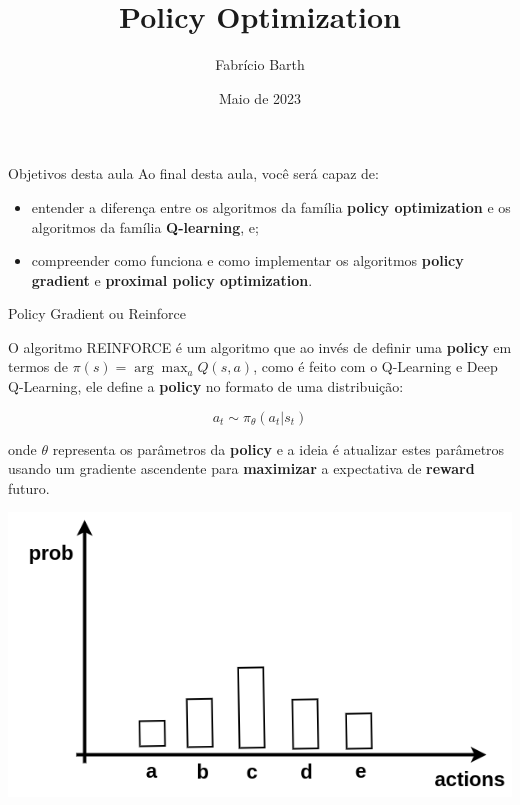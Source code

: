 \documentclass{beamer}
\begin{document}
	
\title{Policy Optimization} 
\author{Fabrício Barth}
\date{Maio de 2023}
	
\maketitle

\def\HiLi{\leavevmode\rlap{\hbox to \hsize{\color{yellow!50}\leaders\hrule height .8\baselineskip depth .5ex\hfill}}}
	
\begin{frame}{Objetivos desta aula}
	Ao final desta aula, você será capaz de: 
		
	\begin{itemize}
		\item entender a diferença entre os algoritmos da família \textbf{policy optimization} e os algoritmos da família \textbf{Q-learning}, e; 
		\item compreender como funciona e como implementar os algoritmos \textbf{policy gradient} e \textbf{proximal policy optimization}. 
	\end{itemize}
\end{frame}

\begin{frame}{Policy Gradient ou Reinforce}
	
	O algoritmo REINFORCE é um algoritmo que ao invés de definir uma \textbf{policy} em termos de $\pi(s) = \arg \max_{a} Q(s,a)$, como é feito com o Q-Learning e Deep Q-Learning, ele define a \textbf{policy} no formato de uma distribuição: 
	
	\begin{equation}
	a_{t} \sim \pi_{\theta}(a_{t} | s_{t})
	\end{equation}	
	
	onde $\theta$ representa os parâmetros da \textbf{policy} e a ideia é atualizar estes parâmetros usando um gradiente ascendente para \textbf{maximizar} a expectativa de \textbf{reward} futuro.
\end{frame}


\begin{frame}
	\begin{center}
		\includegraphics[width=.9\textwidth]{img/distribuicao.png}
	\end{center}
\end{frame}
\end{document}

